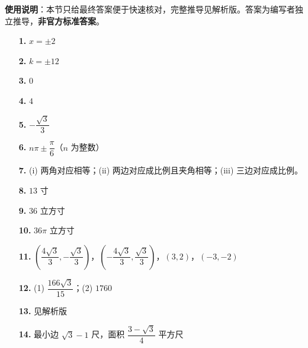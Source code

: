 
\begin{gknotice}
\textbf{使用说明}：本节只给最终答案便于快速核对，完整推导见解析版。答案为编写者独立推导，\textbf{非官方标准答案}。
\end{gknotice}

\begin{itemize}[leftmargin=2.6em]
  \item[\textbf{1.}] $x=\pm2$
  \item[\textbf{2.}] $k=\pm12$
  \item[\textbf{3.}] $0$
  \item[\textbf{4.}] $4$
  \item[\textbf{5.}] $-\dfrac{\sqrt3}{3}$
  \item[\textbf{6.}] $n\pi\pm\dfrac\pi6$（$n$ 为整数）
  \item[\textbf{7.}] (i) 两角对应相等；(ii) 两边对应成比例且夹角相等；(iii) 三边对应成比例。
  \item[\textbf{8.}] $13$ 寸
  \item[\textbf{9.}] $36$ 立方寸
  \item[\textbf{10.}] $36\pi$ 立方寸
\end{itemize}

\begin{itemize}[leftmargin=2.6em]
  \item[\textbf{11.}] $\left(\dfrac{4\sqrt3}{3},-\dfrac{\sqrt3}{3}\right)$，$\left(-\dfrac{4\sqrt3}{3},\dfrac{\sqrt3}{3}\right)$，$(3,2)$，$(-3,-2)$
  \item[\textbf{12.}] (1) $\dfrac{166\sqrt3}{15}$；(2) $1760$
  \item[\textbf{13.}] 见解析版
  \item[\textbf{14.}] 最小边 $\sqrt3-1$ 尺，面积 $\dfrac{3-\sqrt3}{4}$ 平方尺
\end{itemize}
